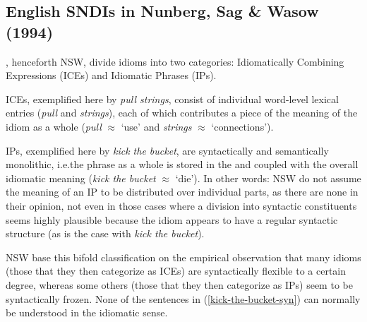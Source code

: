 \documentclass[output=paper]{langsci/langscibook}
\begin{document}
\subsection{English SNDIs in Nunberg, Sag \& Wasow (1994)}

\cite{Nunberg1994}, henceforth NSW, divide  idioms into two categories: Idiomatically Combining Expressions (ICEs) and Idiomatic Phrases (IPs).

ICEs, exemplified here by \textit{pull strings}, consist of individual word-level lexical entries (\textit{pull} and \textit{strings}), each of which contributes a piece of the meaning of the idiom as a whole (\textit{pull} $\approx$ `use' and \textit{strings} $\approx$ `connections').

IPs, exemplified here by \textit{kick the bucket}, are syntactically and semantically monolithic, i.e.\@ the phrase as a whole is stored in the  and coupled with the overall idiomatic meaning (\textit{kick the bucket} $\approx$ `die'). In other words: NSW do not assume the meaning of an IP to be distributed over individual parts, as there are none in their opinion, not even in those cases where a division into syntactic constituents seems highly plausible because the idiom appears to have a regular syntactic structure (as is the case with \textit{kick the bucket}).

NSW base this bifold classification on the empirical observation that many  idioms (those that they then categorize as ICEs) are syntactically  flexible to a certain degree, whereas some others (those that they then categorize as IPs) seem to be syntactically frozen. None of the sentences in (\ref{kick-the-bucket-syn}) can normally be understood in the idiomatic sense.

\begin{exe}
\ex\label{kick-the-bucket-syn}
\begin{xlist}
\end{xlist}
\end{exe}
\end{document}
